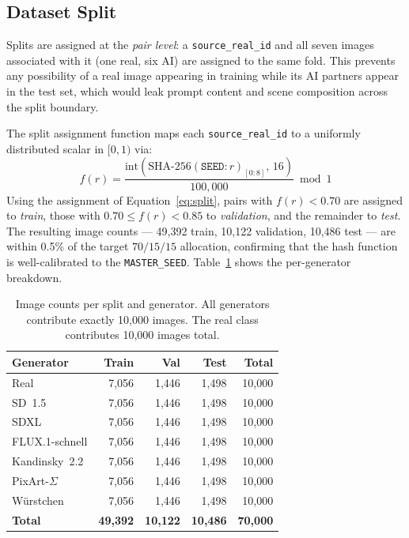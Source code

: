 \subsection{Dataset Split}
\label{ssec:splits}

Splits are assigned at the \emph{pair level}: a \texttt{source\_real\_id}
and all seven images associated with it (one real, six AI) are
assigned to the same fold.
This prevents any possibility of a real image appearing in training
while its AI partners appear in the test set, which would leak prompt
content and scene composition across the split boundary.

The split assignment function maps each \texttt{source\_real\_id} to a
uniformly distributed scalar in $[0, 1)$ via:
\begin{equation}
f(r) = \frac{\mathrm{int}(\mathrm{SHA\text{-}256}
        (\texttt{SEED} : r)_{[0:8]},\, 16)}{100{,}000}
\bmod 1
\label{eq:split}
\end{equation}
Using the assignment of Equation~\ref{eq:split}, pairs with
$f(r) < 0.70$ are assigned to \emph{train}, those with
$0.70 \leq f(r) < 0.85$ to \emph{validation}, and the remainder to
\emph{test}.
The resulting image counts — 49,392 train, 10,122 validation,
10,486 test — are within 0.5\% of the target $70/15/15$ allocation,
confirming that the hash function is well-calibrated to the
\texttt{MASTER\_SEED}.
Table~\ref{tab:split_counts} shows the per-generator breakdown.

\begin{table}[t]
\centering
\caption{Image counts per split and generator.
All generators contribute exactly 10,000 images.
The real class contributes 10,000 images total.}
\label{tab:split_counts}
\small
\begin{tabular}{lrrr|r}
\toprule
Generator & Train & Val & Test & Total \\
\midrule
Real             & 7{,}056 & 1{,}446 & 1{,}498 & 10{,}000 \\
SD~1.5           & 7{,}056 & 1{,}446 & 1{,}498 & 10{,}000 \\
SDXL             & 7{,}056 & 1{,}446 & 1{,}498 & 10{,}000 \\
FLUX.1-schnell   & 7{,}056 & 1{,}446 & 1{,}498 & 10{,}000 \\
Kandinsky~2.2    & 7{,}056 & 1{,}446 & 1{,}498 & 10{,}000 \\
PixArt-$\Sigma$  & 7{,}056 & 1{,}446 & 1{,}498 & 10{,}000 \\
W\"{u}rstchen       & 7{,}056 & 1{,}446 & 1{,}498 & 10{,}000 \\
\midrule
\textbf{Total}   & \textbf{49,392} & \textbf{10,122} & \textbf{10,486} & \textbf{70,000} \\
\bottomrule
\end{tabular}
\end{table}

